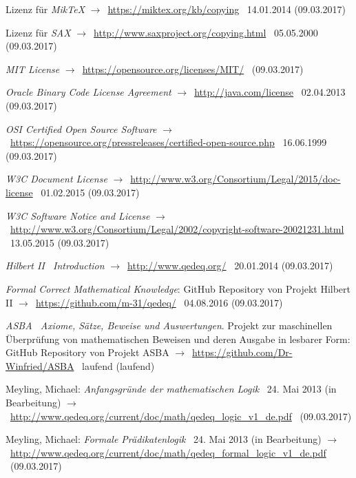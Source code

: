 \documentclass[english,ngerman,parskip=half,headsepline,footsepline]{scrreprt}
\begin{document}
\begin{flushleft}
\begin{thebibliography}{12}
			Lizenz für \emph{MikTeX} $\rightarrow$~\url{https://miktex.org/kb/copying} \textendash\ 14.01.2014 (09.03.2017)

			Lizenz für \emph{SAX} $\rightarrow$~\url{http://www.saxproject.org/copying.html} \textendash\ 05.05.2000 (09.03.2017)

			\emph{MIT License} $\rightarrow$~\url{https://opensource.org/licenses/MIT/} \textendash\ (09.03.2017)

			\emph{Oracle Binary Code License Agreement} $\rightarrow$~\url{http://java.com/license} \textendash\ 02.04.2013 (09.03.2017)

			\emph{OSI Certified Open Source Software} $\rightarrow$~\url{https://opensource.org/pressreleases/certified-open-source.php} \textendash\ 16.06.1999 (09.03.2017)

			\emph{W3C Document License} $\rightarrow$~\url{http://www.w3.org/Consortium/Legal/2015/doc-license} \textendash\ 01.02.2015 (09.03.2017)

			\emph{W3C Software Notice and License} $\rightarrow$~\url{http://www.w3.org/Consortium/Legal/2002/copyright-software-20021231.html} \textendash\ 13.05.2015 (09.03.2017)

			\emph{Hilbert II \textendash\ Introduction} $\rightarrow$~\url{http://www.qedeq.org/} \textendash\ 20.01.2014 (09.03.2017)

			\emph{Formal Correct Mathematical Knowledge}: GitHub Repository von Projekt Hilbert II $\rightarrow$~\url{https://github.com/m-31/qedeq/} \textendash\ 04.08.2016 (09.03.2017)

			\emph{ASBA \textendash\ Axiome, Sätze, Beweise und Auswertungen}. Projekt zur maschinellen Überprüfung von mathematischen Beweisen und deren Ausgabe in lesbarer Form: GitHub Repository von Projekt ASBA $\rightarrow$~\url{https://github.com/Dr-Winfried/ASBA} \textendash\ laufend (laufend)

			Meyling, Michael: \emph{Anfangsgründe der mathematischen Logik} \textendash\ 24. Mai 2013 (in Bearbeitung) $\rightarrow$~\url{http://www.qedeq.org/current/doc/math/qedeq_logic_v1_de.pdf} \textendash\ (09.03.2017)

			Meyling, Michael: \emph{Formale Prädikatenlogik} \textendash\ 24. Mai 2013 (in Bearbeitung) $\rightarrow$~\url{http://www.qedeq.org/current/doc/math/qedeq_formal_logic_v1_de.pdf} \textendash\ (09.03.2017)


\end{thebibliography}
\end{flushleft}
\end{document}
